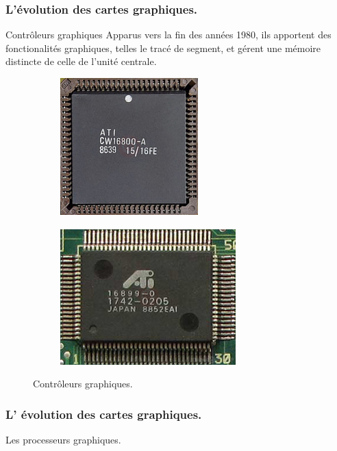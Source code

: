 \documentclass{beamer}
\begin{document}
\begin{frame}
  \frametitle{L'évolution des cartes graphiques.}
\begin{block}{Contrôleurs graphiques}
  Apparus vers la fin des années 1980, ils apportent des fonctionalités graphiques, telles le tracé de segment, et
   gérent une mémoire distincte de celle de l'unité centrale.
   \begin{figure}[htbp]
    \centering
    \hfill
   \begin{subfigure}{0.4\textwidth}
    \includegraphics[scale=0.45]{ATI16800.jpg}
   \end{subfigure} 
   \hfill
   \begin{subfigure}{0.4\textwidth}
    \includegraphics[scale=0.45]{ATI16899.jpg}
   \end{subfigure} 
   \hfill
    \caption{Contrôleurs graphiques.}
    \label{fig:graphic_controllers}
   \end{figure}
\end{block}
\end{frame}
\begin{frame}
  \frametitle{L' évolution des cartes graphiques.}
\begin{block}{Les processeurs graphiques.}
  
\end{block}
\end{frame}
\end{document}
